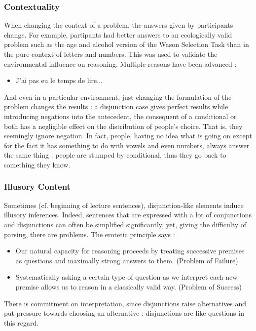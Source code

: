\documentclass{cours}
\begin{document}
\subsubsection{Contextuality}
When changing the context of a problem, the answers given by participants change. For example, partipants had better answers to an ecologically valid problem such as the age and alcohol version of the Wason Selection Task than in the pure context of letters and numbers. This was used to validate the environmental influence on reasoning. Multiple reasons have been advanced : 
\begin{itemize}
    \item J'ai pas eu le temps de lire...
\end{itemize}
And even in a particular environment, just changing the formulation of the problem changes the results : a disjunction case gives perfect results while introducing negations into the antecedent, the consequent of a conditional or both has a negligible effect on the distribution of people's choice. That is, they seemingly ignore negation. In fact, people, having no idea what is going on except for the fact it has something to do with vowels and even numbers, always answer the same thing : people are stumped by conditional, thus they go back to something they know. \\

\subsubsection{Illusory Content}
Sometimes (cf. beginning of lecture sentences), disjunction-like elements induce illusory inferences. Indeed, sentences that are expressed with a lot of conjunctions and disjunctions can often be simplified significantly, yet, giving the difficulty of parsing, there are problems. The erotetic principle says :
\begin{itemize}
    \item Our natural capacity for reasoning proceeds by treating successive premises as questions and maximally strong answers to them. (Problem of Failure)
    \item Systematically asking a certain type of question as we interpret each new premise allows us to reason in a classically valid way. (Problem of Success)
\end{itemize}
There is commitment on interpretation, since disjunctions raise alternatives and put pressure towards choosing an alternative : disjunctions are like questions in this regard. 
\end{document}
